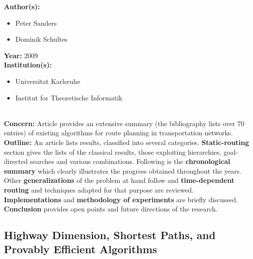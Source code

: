 \documentclass[a4paper]{article}
\newenvironment{itemizesp}
{
    \begin{itemize}
}
{
    \end{itemize}
}
\newcommand{\textbff}[1]{{\large \textbf{#1}}}
\begin{document}
        \textbff{Author(s): }
        \begin{itemizesp}
            \item Peter Sanders
            \item Dominik Schultes
        \end{itemizesp}
        \textbff{Year: }2009\\
        \textbff{Institution(s): }
        \begin{itemizesp}
            \item Universitat Karlsruhe
            \item Institut for Theoretische Informatik
        \end{itemizesp}
        {\hfill}\\
        \textbff{Concern:} Article provides an extensive summary (the bibliography lists over 70 entries) of existing algorithms for route planning in transportation networks. \\

        \textbff{Outline:} An article lists results, classified into several categories. \textbf{Static-routing} section gives the lists of the classical results, those exploiting hierarchies, goal-directed searches and various combinations. Following is the \textbf{chronological summary} which clearly illustrates the progress obtained throughout the years. Other \textbf{generalizations} of the problem at hand follow and \textbf{time-dependent routing} and techniques adapted for that purpose are reviewed. \textbf{Implementations} and \textbf{methodology of experiments} are briefly discussed. \textbf{Conclusion} provides open points and future directions of the research.

        \subsection{Highway Dimension, Shortest Paths, and Provably Efficient Algorithms}
        \label{subsec:highwaydim}
\end{document}
